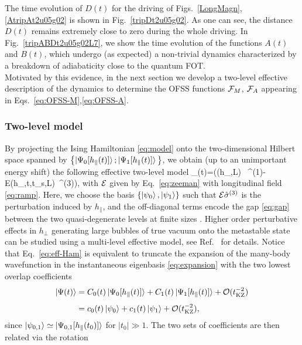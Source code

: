 The time evolution of $D(t)$ for the driving of Figs.~\ref{LongMagn},\ref{AtripAt2u05g02} is shown in Fig.~\ref{tripDt2u05g02}. As one can see, the distance $D(t)$ remains extremely close to zero during the whole driving. In Fig.~\ref{tripABDt2u05g02L7}, we show the time evolution of the functions $A(t)$ and $B(t)$, which undergo (as expected) a non-trivial dynamics characterized by a breakdown of adiabaticity close to the quantum FOT.\\

 Motivated by this evidence, in the next section we develop a two-level effective description of the dynamics to determine the OFSS functions ${\cal F}_M$, ${\cal F}_A$ appearing in Eqs.~\eqref{eq:OFSS-M},\eqref{eq:OFSS-A}.
\subsubsection{Two-level model}\label{sec:2-lev}
By projecting the Ising Hamiltonian \eqref{eq:model} onto the two-dimensional Hilbert space spanned by  $\bigl\{ \ket{\Psi_0[h_\parallel(t)]};\ket{\Psi _1[h_\parallel(t)]} \bigl\}$, we obtain (up to an unimportant energy shift) the following effective two-level model 
\be\label{eq:eff-Ham}
_(t)=\left(\Delta(h_\perp,L) \ \hat\sigma^{(1)}-{\cal E}(h_\perp,t,t_s,L)\ \hat\sigma^{(3)}\right),
\ee
with ${\cal E}$ given by Eq.~\eqref{eq:zeeman} with longitudinal field \eqref{eq:ramp}. Here, we choose the basis $\{\ket{\psi_0}, \ket{\psi_1}\}$ such that ${\cal E}\hat\sigma^{(3)}$ is the perturbation induced by $h_\parallel$, and the off-diagonal terms encode the gap \eqref{eq:gap} between the two quasi-degenerate levels at finite sizes \cite{campostrini2014finite}. Higher order perturbative effects in $h_\perp$ generating large bubbles of true vacuum onto the metastable state can be studied using a multi-level effective model, see Ref.~\cite{sinha2021nonadiabatic} for details.  Notice that Eq.~\eqref{eq:eff-Ham} is equivalent to truncate the expansion of the many-body wavefunction in the instantaneous eigenbasis \eqref{eq:expansion} with the two lowest overlap coefficients
\begin{align}
\ket{\Psi(t)}&=C_0(t) \ket{\Psi_0[h_\parallel(t)]}+ C_1(t) \ket{\Psi _1[h_\parallel(t)]} +{\cal O}(t_{\rm KZ}^{-2})
\nonumber\\[4pt]
&=c_0(t) \ket{\psi_0}+ c_1(t) \ket{\psi _1} +{\cal O}(t_{\rm KZ}^{-2}),
\end{align}
since $\ket{\psi_{0,1}}\simeq \ket{\Psi_{0,1}[h_\parallel(t_0)]}$ for $|t_0|\gg 1$. The two sets of coefficients are then related via the rotation
